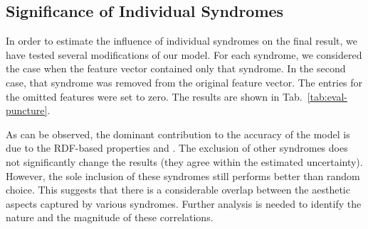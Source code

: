\begin{table}[p]
  \begin{center}
  \end{center}
  \caption{%
    Accuracy scores for the  and  model.  The standard deviation in each column is estimated
    based on the $5$-fold cross-validation (using $20\percent$ of data for testing each time).  The \enquote{Advantage}
    column shows the improvement in the accuracy of our model with respect to the alternative metric.
  }
  \label{tab:competing-metrics}
\end{table}

\subsection{Significance of Individual Syndromes}

In order to estimate the influence of individual syndromes on the final result, we have tested several modifications of
our model.  For each syndrome, we considered the case when the feature vector contained only that syndrome.  In the
second case, that syndrome was removed from the original feature vector.  The entries for the omitted features were set
to zero.  The results are shown in Tab.~\ref{tab:eval-puncture}.

\begin{table}
  \begin{center}
  \end{center}
  \caption{%
    Success rates of our discriminator when a syndrome is excluded from the feature vector, and when the feature vector
    contains only that a syndrome.  Note that  is a family of syndromes that are all included or
    excluded together.  The apparent paradox of higher success rates when some syndromes are excluded can be explained
    by a statistical fluctuation and is well within the listed range of uncertainty.
  }
  \label{tab:eval-puncture}
\end{table}

As can be observed, the dominant contribution to the accuracy of the model is due to the RDF-based properties
 and .  The exclusion of other syndromes does not significantly change the results
(they agree within the estimated uncertainty).  However, the sole inclusion of these syndromes still performs better
than random choice.  This suggests that there is a considerable overlap between the aesthetic aspects captured by
various syndromes.  Further analysis is needed to identify the nature and the magnitude of these correlations.
